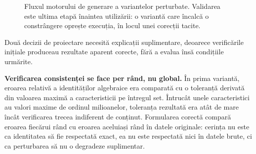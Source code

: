 \begin{figure}[!ht]
    \centering
    \caption{Fluxul motorului de generare a variantelor perturbate. Validarea este ultima etapă înaintea utilizării: o variantă care încalcă o constrângere oprește execuția, în locul unei corecții tacite.}
    \label{fig:motor}
\end{figure}

Două decizii de proiectare necesită explicații suplimentare, deoarece verificările inițiale produceau rezultate aparent corecte, fără a evalua însă condițiile urmărite.

\textbf{Verificarea consistenței se face per rând, nu global.} În prima variantă, eroarea relativă a identităților algebraice era comparată cu o toleranță derivată din valoarea maximă a caracteristicii pe întregul set. Întrucât unele caracteristici au valori maxime de ordinul milioanelor, toleranța rezultată era atât de mare încât verificarea trecea indiferent de conținut. Formularea corectă compară eroarea fiecărui rând cu eroarea aceluiași rând în datele originale: cerința nu este ca identitatea să fie respectată exact, ea nu este respectată nici în datele brute, ci ca perturbarea să nu o degradeze suplimentar.

